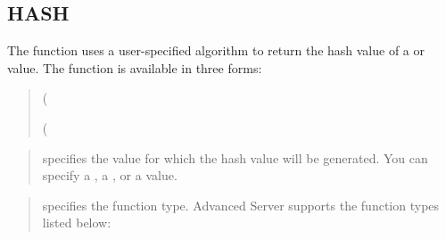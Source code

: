 \documentclass[letterpaper,10pt,english,openany,oneside]{sphinxmanual}
\begin{document}
\subsection{HASH}
\label{\detokenize{hash::doc}}\label{\detokenize{hash:hash}}
The  function uses a user-specified algorithm to return the hash
value of a  or  value. The  function is available in three
forms:
\begin{quote}

\begin{DUlineblock}{0em}
\item[] 
\item[]
\begin{DUlineblock}{\DUlineblockindent}
\item[] (
\end{DUlineblock}
\end{DUlineblock}

\begin{DUlineblock}{0em}
\item[] 
\item[]
\begin{DUlineblock}{\DUlineblockindent}
\item[] (
\end{DUlineblock}
\end{DUlineblock}
\end{quote}


\begin{quote}

 specifies the value for which the hash value will be
generated. You can specify a , a , or a  value.
\end{quote}

\begin{quote}

 specifies the  function type. Advanced Server supports the
 function types listed below:
\end{quote}
\end{document}
